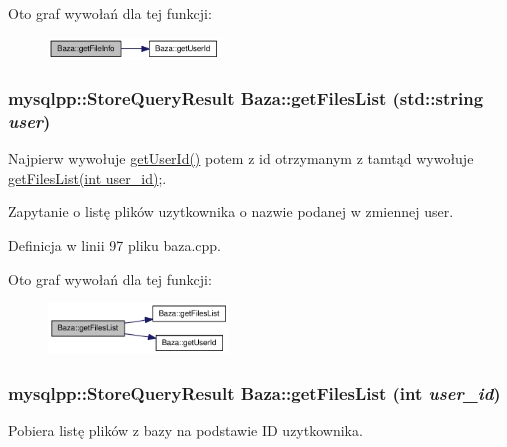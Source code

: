 Oto graf wywołań dla tej funkcji:\nopagebreak
\begin{figure}[H]
\begin{center}
\leavevmode
\includegraphics[width=129pt]{a00001_e4a033a65cb585aa91c15fd8b8fde764_cgraph}
\end{center}
\end{figure}
\hypertarget{a00001_2eace36725672b3a4ce639f91fe7d9bd}{
\subsubsection[{getFilesList}]{\setlength{\rightskip}{0pt plus 5cm}mysqlpp::StoreQueryResult Baza::getFilesList (std::string {\em user})}}
\label{a00001_2eace36725672b3a4ce639f91fe7d9bd}


Najpierw wywołuje \hyperlink{a00001_65054f08c8fd7c600f6c2fe2c7f61a43}{getUserId()} potem z id otrzymanym z tamtąd wywołuje \hyperlink{a00001_02db3388d088212bd443ee39998b5cf8}{getFilesList(int user\_\-id)};. 

Zapytanie o listę plików uzytkownika o nazwie podanej w zmiennej user. 

Definicja w linii 97 pliku baza.cpp.

Oto graf wywołań dla tej funkcji:\nopagebreak
\begin{figure}[H]
\begin{center}
\leavevmode
\includegraphics[width=136pt]{a00001_2eace36725672b3a4ce639f91fe7d9bd_cgraph}
\end{center}
\end{figure}
\hypertarget{a00001_02db3388d088212bd443ee39998b5cf8}{
\subsubsection[{getFilesList}]{\setlength{\rightskip}{0pt plus 5cm}mysqlpp::StoreQueryResult Baza::getFilesList (int {\em user\_\-id})}}
\label{a00001_02db3388d088212bd443ee39998b5cf8}


Pobiera listę plików z bazy na podstawie ID uzytkownika. 

